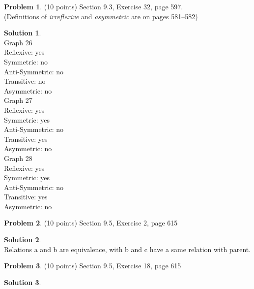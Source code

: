 \documentclass{article}
\theoremstyle{definition}
\newtheorem{problem}{Problem}
\newtheorem*{solution}{Solution}
\begin{document}
\begin{problem} (10 points)
Section 9.3, Exercise 32, page 597.\\(Definitions of \textit{irreflexive} and \textit{asymmetric} are on pages 581--582)
\end{problem}
\begin{solution}~\\
Graph 26\\
\indent Reflexive: yes \\
\indent Symmetric: no \\
\indent Anti-Symmetric: no \\
\indent Transitive: no \\
\indent Asymmetric: no \\

Graph 27\\
\indent Reflexive: yes \\
\indent Symmetric: yes \\
\indent Anti-Symmetric: no \\ 
\indent Transitive: yes \\
\indent Asymmetric: no \\

Graph 28\\
\indent Reflexive: yes \\
\indent Symmetric: yes \\
\indent Anti-Symmetric: no \\ 
\indent Transitive: yes \\
\indent Asymmetric: no \\
\end{solution}



\begin{problem} (10 points)
Section 9.5, Exercise 2, page 615
\end{problem}
\begin{solution}~\\
Relations a and b are equivalence, with b and c have a same relation with parent.\\
\end{solution}

\begin{problem} (10 points)
Section 9.5, Exercise 18, page 615
\end{problem}
\begin{solution}~\\

\end{solution}
\end{document}
